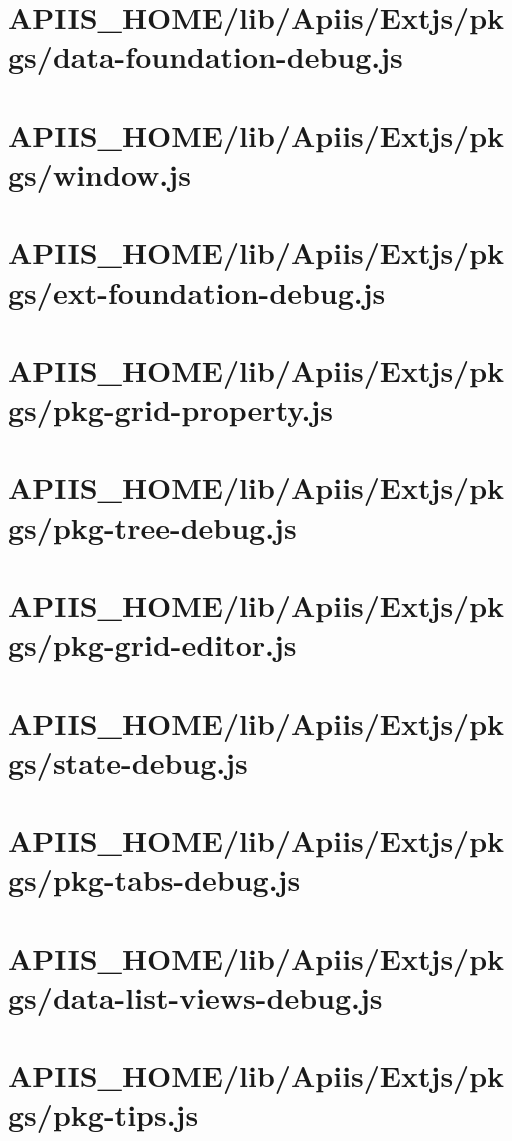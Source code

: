 \section{APIIS\_HOME/lib/Apiis/Extjs/pkgs/data-foundation-debug.js} 
\section{APIIS\_HOME/lib/Apiis/Extjs/pkgs/window.js} 
\section{APIIS\_HOME/lib/Apiis/Extjs/pkgs/ext-foundation-debug.js} 
\section{APIIS\_HOME/lib/Apiis/Extjs/pkgs/pkg-grid-property.js} 
\section{APIIS\_HOME/lib/Apiis/Extjs/pkgs/pkg-tree-debug.js} 
\section{APIIS\_HOME/lib/Apiis/Extjs/pkgs/pkg-grid-editor.js} 
\section{APIIS\_HOME/lib/Apiis/Extjs/pkgs/state-debug.js} 
\section{APIIS\_HOME/lib/Apiis/Extjs/pkgs/pkg-tabs-debug.js} 
\section{APIIS\_HOME/lib/Apiis/Extjs/pkgs/data-list-views-debug.js} 
\section{APIIS\_HOME/lib/Apiis/Extjs/pkgs/pkg-tips.js} 
